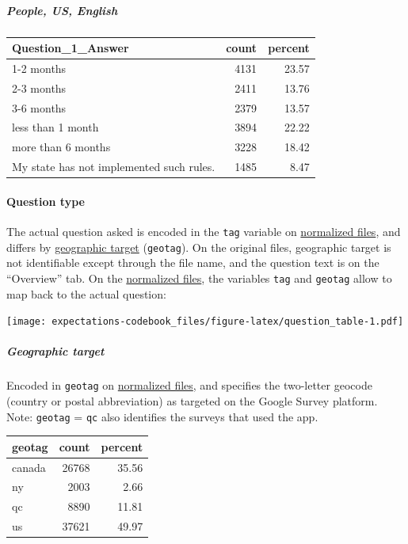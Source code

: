 \documentclass[
]{article}
\begin{document}
\hypertarget{people-us-english}{%
\subparagraph{People, US, English}\label{people-us-english}}

\begin{longtable}[]{@{}lrr@{}}
\toprule
Question\_1\_Answer & count & percent \\
\midrule
\endhead
1-2 months & 4131 & 23.57 \\
2-3 months & 2411 & 13.76 \\
3-6 months & 2379 & 13.57 \\
less than 1 month & 3894 & 22.22 \\
more than 6 months & 3228 & 18.42 \\
My state has not implemented such rules. & 1485 & 8.47 \\
\bottomrule
\end{longtable}

\hypertarget{question-type}{%
\paragraph{Question type}\label{question-type}}

The actual question asked is encoded in the \texttt{tag} variable on
\protect\hyperlink{normalized-files}{normalized files}, and differs by
\protect\hyperlink{geographic-target}{geographic target}
(\texttt{geotag}). On the original files, geographic target is not
identifiable except through the file name, and the question text is on
the ``Overview'' tab. On the
\protect\hyperlink{normalized-files}{normalized files}, the variables
\texttt{tag} and \texttt{geotag} allow to map back to the actual
question:

\texttt{[image: expectations-codebook\_files/figure-latex/question\_table-1.pdf]}

\hypertarget{geographic-target}{%
\subparagraph{Geographic target}\label{geographic-target}}

Encoded in \texttt{geotag} on
\protect\hyperlink{normalized-files}{normalized files}, and specifies
the two-letter geocode (country or postal abbreviation) as targeted on
the Google Survey platform. Note: \texttt{geotag} = \texttt{qc} also
identifies the surveys that used the app.

\begin{longtable}[]{@{}lrr@{}}
\toprule
geotag & count & percent \\
\midrule
\endhead
canada & 26768 & 35.56 \\
ny & 2003 & 2.66 \\
qc & 8890 & 11.81 \\
us & 37621 & 49.97 \\
\bottomrule
\end{longtable}
\end{document}
